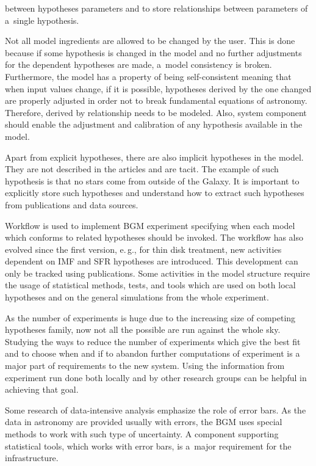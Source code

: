 \begin{multicols}{2}
\addtocounter{figure}{1}

\noindent
 between hypotheses parameters 
and to store relationships between parameters of a~single hypothesis.
      
      
      
      Not all model ingredients are allowed to be changed by the user. This is done 
because if some hypothesis is changed in the model and no further adjustments for 
the dependent hypotheses are made, a~model consistency is broken. Furthermore, the 
model has a property of being self-consistent meaning that when input values change, 
if it is possible, hypotheses derived by the one changed are properly adjusted in order 
not to break fundamental equations of astronomy. Therefore, derived by relationship 
needs to be modeled. Also, system component should enable the adjustment and 
calibration of any hypothesis available in the model.


      
      Apart from explicit hypotheses, there are also implicit hypotheses in the 
model. They are not described in the articles and are tacit. The example of such 
hypothesis is that no stars come from outside of the Galaxy. It is important to 
explicitly store such hypotheses and understand how to extract such hypotheses from 
publications and data sources.
      
      Workflow is used to implement BGM experiment specifying when each 
model which conforms to related hypotheses should be invoked. The workflow has 
also evolved since the first version, e.\,g., for thin disk treatment, new activities 
dependent on IMF and SFR hypotheses are introduced. This development can only be 
tracked using publications. Some activities in the model structure require the usage of 
statistical methods, tests, and tools which are used on both local hypotheses and on 
the general simulations from the whole experiment.
      
      As the number of experiments is huge due to the increasing size of competing 
hypotheses family, now not all the possible are run against the whole sky. Studying 
the ways to reduce the number of experiments which give the best fit and to choose 
when and if to abandon further computations of experiment is a major part of 
requirements to the new system. Using the information from experiment run done 
both locally and by other research groups can be helpful in achieving that goal.
      
      Some research of data-intensive analysis emphasize the role of error bars. As 
the data in astronomy are provided usually with errors, the BGM uses special methods 
to work with such type of uncertainty. A component supporting statistical tools, 
which works with error bars, is a~major requirement for the infrastructure.


\end{multicols}
